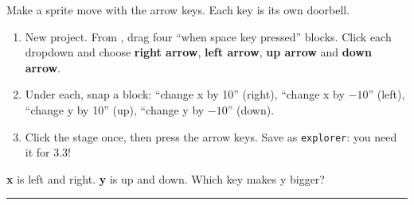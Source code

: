 \begin{exercise}
Make a sprite move with the arrow keys. Each key is its own doorbell.
\begin{enumerate}[leftmargin=1.4em,itemsep=1pt]
  \item New project. From , drag four \enquote{when space key pressed} blocks. Click each dropdown and choose \textbf{right arrow}, \textbf{left arrow}, \textbf{up arrow} and \textbf{down arrow}.
  \item Under each, snap a  block: \enquote{change x by 10} (right), \enquote{change x by $-10$} (left), \enquote{change y by 10} (up), \enquote{change y by $-10$} (down).
  \item Click the stage once, then press the arrow keys. Save as \texttt{explorer}: you need it for 3.3!
\end{enumerate}
\begin{center}
\begin{scratch}[scale=0.78]
\end{scratch}\hspace{0.4cm}
\begin{scratch}[scale=0.78]
\end{scratch}\hspace{0.4cm}
\begin{scratch}[scale=0.78]
\end{scratch}

\medskip
\begin{scratch}[scale=0.78]
\end{scratch}
\end{center}
\textbf{x} is left and right. \textbf{y} is up and down. Which key makes y bigger? \rule{3cm}{0.4pt}
\end{exercise}

